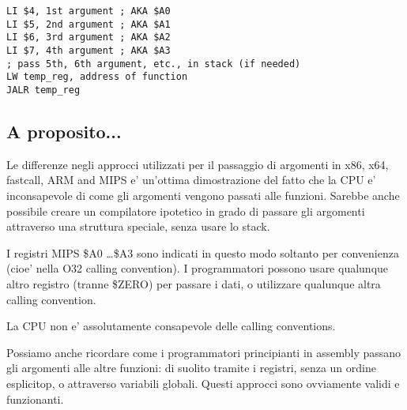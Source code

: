 \begin{lstlisting}[caption=MIPS (O32 calling convention),style=customasmMIPS]
LI $4, 1st argument ; AKA $A0
LI $5, 2nd argument ; AKA $A1
LI $6, 3rd argument ; AKA $A2
LI $7, 4th argument ; AKA $A3
; pass 5th, 6th argument, etc., in stack (if needed)
LW temp_reg, address of function
JALR temp_reg
\end{lstlisting}

\subsection{A proposito...}

Le differenze negli approcci utilizzati per il passaggio di argomenti in x86, x64, 
fastcall, ARM and MIPS e' un'ottima dimostrazione del fatto che la CPU e' inconsapevole di come gli argomenti vengono passati alle funzioni. 
Sarebbe anche possibile creare un compilatore ipotetico in grado di passare gli argomenti attraverso una struttura speciale, senza usare lo stack.

I registri MIPS \$A0 \dots \$A3 sono indicati in questo modo soltanto per convenienza (cioe' nella O32 calling convention).
I programmatori possono usare qualunque altro registro (tranne \$ZERO) per passare i dati, o utilizzare qualunque altra calling convention. 

La \ac{CPU} non e' assolutamente consapevole delle calling conventions.

Possiamo anche ricordare come i programmatori principianti in assembly passano gli argomenti alle altre funzioni: 
di suolito tramite i registri, senza un ordine esplicitop, o attraverso variabili globali.
Questi approcci sono ovviamente validi e funzionanti.
